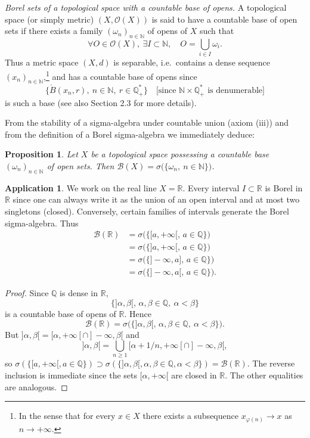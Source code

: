 \documentclass[12pt]{article}
\newtheorem{proposition}{Proposition}[section]
\theoremstyle{definition}
\newtheorem{application}{Application}[section]
\begin{document}
\medskip\noindent
\textit{Borel sets of a topological space with a countable base of opens.}
A topological space (or simply metric) $(X,\mathcal O(X))$ is said to have a countable base of open sets if there exists a family $(\omega_n)_{n\in\mathbb N}$ of opens of $X$ such that
\[
\forall O\in\mathcal O(X),\ \exists I\subset\mathbb N,\quad O=\bigcup_{i\in I}\omega_i .
\]
Thus a metric space $(X,d)$ is separable, i.e.\ contains a dense sequence $(x_n)_{n\in\mathbb N}$,\footnote{In the sense that for every $x\in X$ there exists a subsequence $x_{\varphi(n)}\to x$ as $n\to +\infty$.}
and has a countable base of opens since
\[
\bigl\{\mathring B(x_n,r),\ n\in\mathbb N,\ r\in\mathbb Q^{\ast}_+\bigr\}\quad\text{[since $\mathbb N\times\mathbb Q^{\ast}_+$ is denumerable]}
\]
is such a base (see also Section 2.3 for more details).

From the stability of a sigma-algebra under countable union (axiom (iii)) and from the definition of a Borel sigma-algebra we immediately deduce:

\begin{proposition}
Let $X$ be a topological space possessing a countable base $(\omega_n)_{n\in\mathbb N}$ of open sets. Then $\mathcal B(X)=\sigma\bigl(\{\omega_n,\ n\in\mathbb N\}\bigr)$.
\end{proposition}

\begin{application}
We work on the real line $X=\mathbb R$. Every interval $I\subset\mathbb R$ is Borel in $\mathbb R$ since one can always write it as the union of an open interval and at most two singletons (closed). Conversely, certain families of intervals generate the Borel sigma-algebra. Thus
\[
\begin{aligned}
\mathcal B(\mathbb R)
&= \sigma\bigl(\{[a,+\infty[,\, a\in\mathbb Q\}\bigr) \\
&= \sigma\bigl(\{]a,+\infty[,\, a\in\mathbb Q\}\bigr) \\
&= \sigma\bigl(\{]-\infty,a],\, a\in\mathbb Q\}\bigr) \\
&= \sigma\bigl(\{]-\infty,a[,\, a\in\mathbb Q\}\bigr).
\end{aligned}
\]

\end{application}

\begin{proof}

Since $\mathbb Q$ is dense in $\mathbb R$,
\[
\{] \alpha,\beta[,\, \alpha,\beta\in\mathbb Q,\ \alpha<\beta\}
\]
is a countable base of opens of $\mathbb R$. Hence
\[
\mathcal B(\mathbb R)=\sigma\bigl(\{] \alpha,\beta[,\, \alpha,\beta\in\mathbb Q,\ \alpha<\beta\}\bigr).
\]
But $] \alpha,\beta[ = [\alpha,+\infty[ \cap ]-\infty,\beta[$ and
\[
] \alpha,\beta[=\bigcup_{n\ge1} [\alpha+1/n,+\infty[ \cap ]-\infty,\beta[,
\]
so $\sigma(\{[a,+\infty[, a\in\mathbb Q\})\supset \sigma(\{] \alpha,\beta[, \alpha,\beta\in\mathbb Q,\alpha<\beta\})=\mathcal B(\mathbb R)$. The reverse inclusion is immediate since the sets $[\alpha,+\infty[$ are closed in $\mathbb R$. The other equalities are analogous.

\end{proof}
\end{document}
